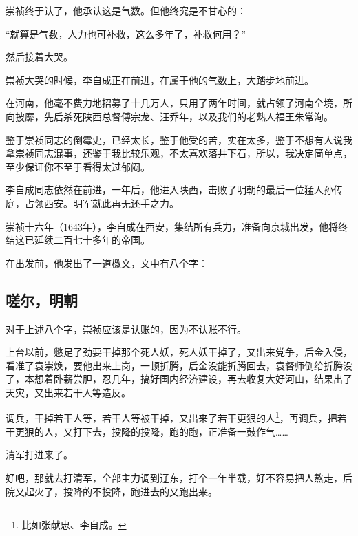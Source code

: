 \begin{multicols}{\theparacolNo}
		崇祯终于认了，他承认这是气数。但他终究是不甘心的：

		“就算是气数，人力也可补救，这么多年了，补救何用？”

		然后接着大哭。

		崇祯大哭的时候，李自成正在前进，在属于他的气数上，大踏步地前进。

		在河南，他毫不费力地招募了十几万人，只用了两年时间，就占领了河南全境，所向披靡，先后杀死陕西总督傅宗龙、汪乔年，以及我们的老熟人福王朱常洵。

		鉴于崇祯同志的倒霉史，已经太长，鉴于他受的苦，实在太多，鉴于不想有人说我拿崇祯同志混事，还鉴于我比较乐观，不太喜欢落井下石，所以，我决定简单点，至少保证你不至于看得太过郁闷。

		李自成同志依然在前进，一年后，他进入陕西，击败了明朝的最后一位猛人孙传庭，占领西安。明军就此再无还手之力。

		崇祯十六年（1643年），李自成在西安，集结所有兵力，准备向京城出发，他将终结这已延续二百七十多年的帝国。

		在出发前，他发出了一道檄文，文中有八个字：
		\begin{quote}
			\begin{spacing}{0.5}  %
				\textit{{\footnotesize
							\begin{description}
								\item[\textcolor{Gray}{\faQuoteRight}] 嗟尔明朝，气数已尽。
							\end{description}
						}}
			\end{spacing}
		\end{quote}

		\subsection{嗟尔，明朝}
		对于上述八个字，崇祯应该是认账的，因为不认账不行。

		上台以前，憋足了劲要干掉那个死人妖，死人妖干掉了，又出来党争，后金入侵，看准了袁崇焕，要他出来上岗，一顿折腾，后金没能折腾回去，袁督师倒给折腾没了，本想着卧薪尝胆，忍几年，搞好国内经济建设，再去收复大好河山，结果出了天灾，又出来若干人等造反。

		调兵，干掉若干人等，若干人等被干掉，又出来了若干更狠的人\footnote{比如张献忠、李自成。}，再调兵，把若干更狠的人，又打下去，投降的投降，跑的跑，正准备一鼓作气……

		清军打进来了。

		好吧，那就去打清军，全部主力调到辽东，打个一年半载，好不容易把人熬走，后院又起火了，投降的不投降，跑进去的又跑出来。


\end{multicols}
